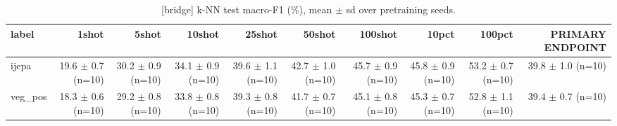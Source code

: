 \begin{table}[t]
\centering
\small
\caption{[bridge] k-NN test macro-F1 (\%), mean $\pm$ sd over pretraining seeds.}
\label{tab:main_results_knn}
\begin{tabular}{lrrrrrrrrr}
\toprule
label & 1shot & 5shot & 10shot & 25shot & 50shot & 100shot & 10pct & 100pct & PRIMARY ENDPOINT \\
\midrule
ijepa & 19.6 $\pm$ 0.7 (n=10) & 30.2 $\pm$ 0.9 (n=10) & 34.1 $\pm$ 0.9 (n=10) & 39.6 $\pm$ 1.1 (n=10) & 42.7 $\pm$ 1.0 (n=10) & 45.7 $\pm$ 0.9 (n=10) & 45.8 $\pm$ 0.9 (n=10) & 53.2 $\pm$ 0.7 (n=10) & 39.8 $\pm$ 1.0 (n=10) \\
veg\_pos & 18.3 $\pm$ 0.6 (n=10) & 29.2 $\pm$ 0.8 (n=10) & 33.8 $\pm$ 0.8 (n=10) & 39.3 $\pm$ 0.8 (n=10) & 41.7 $\pm$ 0.7 (n=10) & 45.1 $\pm$ 0.8 (n=10) & 45.3 $\pm$ 0.7 (n=10) & 52.8 $\pm$ 1.1 (n=10) & 39.4 $\pm$ 0.7 (n=10) \\
\bottomrule
\end{tabular}
\end{table}
